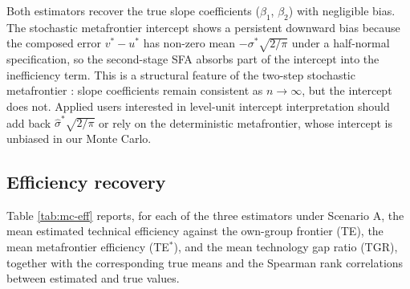 Both estimators recover the true slope coefficients (\(\beta_1\), \(\beta_2\))
with negligible bias. The stochastic metafrontier intercept shows a
persistent downward bias because the composed error \(v^* - u^*\) has
non-zero mean \(-\sigma^*\sqrt{2/\pi}\) under a half-normal specification,
so the second-stage SFA absorbs part of the intercept into the
inefficiency term. This is a structural feature of the two-step
stochastic metafrontier \citep{huang2014}: slope coefficients remain
consistent as \(n \to \infty\), but the intercept does not. Applied users
interested in level-unit intercept interpretation should add back
\(\hat\sigma^*\sqrt{2/\pi}\) or rely on the deterministic metafrontier,
whose intercept is unbiased in our Monte Carlo.

\subsection{Efficiency recovery}\label{sec:efficiency-recovery}

Table \ref{tab:mc-eff} reports, for each of the three estimators under
Scenario A, the mean estimated technical efficiency against the own-group
frontier (TE), the mean metafrontier efficiency (TE\(^*\)), and the mean
technology gap ratio (TGR), together with the corresponding true means and
the Spearman rank correlations between estimated and true values.

\begin{table}
\centering
\caption{\label{tab:mc-eff}Efficiency recovery under Scenario A (means over 500 replications). TE is efficiency against the own-group frontier, TE* against the metafrontier, and TGR the technology gap ratio; Corr denotes the Spearman rank correlation between estimated and true values within a replication.}
\centering
{}
\end{table}

